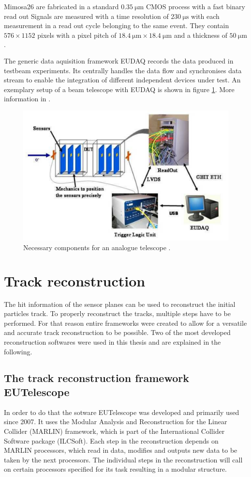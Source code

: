 Mimosa26 are fabricated in a standard $\SI{0.35}{\micro\meter}$ CMOS process with a fast binary read out
Signals are measured with a time resolution of $\SI{230}{\micro\second}$ with each measurement in a read out cycle belonging to the same event.
They contain $576 \times 1152$ pixels with a pixel pitch of $\SI{18.4}{\micro\meter} \times \SI{18.4}{\micro\meter}$
and a thickness of $\SI{50}{\micro\meter}$.

The generic data aquisition framework EUDAQ records the data produced in testbeam experiments. Its centrally handles the data flow and synchronises data stream to enable
the integration of different independent devices under test. An exemplary setup of a beam telescope with EUDAQ is shown in figure \ref{fig:eudaq_bild}.
More information in \cite{eudaq}.

\begin{figure}
  \centering
  \includegraphics[height=0.4\textwidth]{images/eudaq.png}
  \caption{Necessary components for an analogue telescope \cite{eudaq_bild}.}
  \label{fig:eudaq_bild}
\end{figure}

\chapter{Track reconstruction}
The hit information of the sensor planes can be used to reconstruct the initial particles track. To properly reconstruct the tracks, multiple steps have to
be performed. For that reason entire frameworks were created to allow for a versatile and accurate track reconstruction to be possible. Two of the most
developed reconstruction softwares were used in this thesis and are explained in the following.

\section{The track reconstruction framework EUTelescope}
In order to do that the sotware EUTelescope was developed and
primarily used since 2007. It uses the Modular Analysis and Reconstruction for the Linear Collider (MARLIN) framework, which is part of the
International Collider Software package (ILCSoft). Each step in the reconstruction depends on MARLIN processors, which read in data, modifies and outputs new data to be
taken by the next processors. The individual steps in the reconstruction will call on certain processors specified for its task resulting in a
modular structure.

